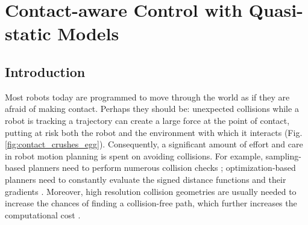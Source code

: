 \chapter{Contact-aware Control with Quasi-static Models} \label{chapter:quasi_static_control}
\section{Introduction}
Most robots today are programmed to move through the world as if they are afraid of making contact. Perhaps they should be: unexpected collisions while a robot is tracking a trajectory can create a large force at the point of contact, putting at risk both the robot and the environment with which it interacts (Fig. \ref{fig:contact_crushes_egg}). Consequently, a significant amount of effort and care in robot motion planning is spent on avoiding collisions. For example, sampling-based planners need to perform numerous collision checks \cite{lavalle2006planning}; optimization-based planners need to constantly evaluate the signed distance functions and their gradients \cite{ratliff2009chomp}. Moreover, high resolution collision geometries are usually needed to increase the chances of finding a collision-free path, which further increases the computational cost \cite{pan2012fcl}.

